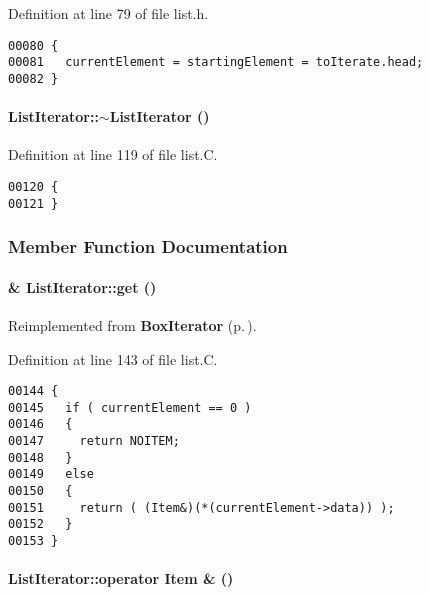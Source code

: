 Definition at line 79 of file list.h.\small\begin{verbatim}00080 {
00081   currentElement = startingElement = toIterate.head;  
00082 }
\end{verbatim}\normalsize 
\label{ListIterator_a1}
\paragraph{\setlength{\rightskip}{0pt plus 5cm}List\-Iterator::$\sim$List\-Iterator ()\hspace{0.3cm}{\tt  [virtual]}}\hfill



Definition at line 119 of file list.C.\small\begin{verbatim}00120 {
00121 }
\end{verbatim}\normalsize 


\subsubsection{Member Function Documentation}
\label{ListIterator_a4}
\paragraph{ \& List\-Iterator::get ()\hspace{0.3cm}{\tt  [virtual]}}\hfill



Reimplemented from {\bf Box\-Iterator} {\rm (p.\,\pageref{BoxIterator_a4})}.

Definition at line 143 of file list.C.\small\begin{verbatim}00144 {
00145   if ( currentElement == 0 )
00146   {
00147     return NOITEM;
00148   }
00149   else
00150   {
00151     return ( (Item&)(*(currentElement->data)) );
00152   }
00153 }
\end{verbatim}\normalsize 
\label{ListIterator_a3}
\paragraph{\setlength{\rightskip}{0pt plus 5cm}List\-Iterator::operator {\bf Item} \& ()\hspace{0.3cm}{\tt  [virtual]}}\hfill



